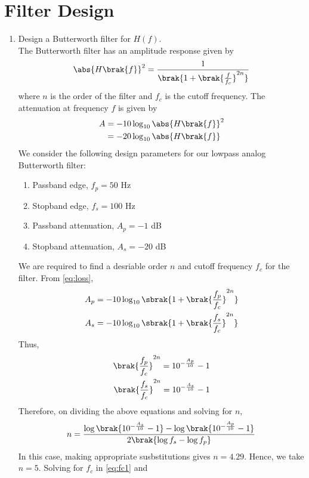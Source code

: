 \documentclass[journal,12pt,twocolumn]{IEEEtran}
\renewcommand\thesection{\arabic{section}}
\begin{document}
\section{Filter Design}
\begin{enumerate}[label=\thesection.\arabic*
,ref=\thesection.\theenumi]
\item Design a Butterworth filter for $H(f)$. \\
\solution
The Butterworth filter has an amplitude response
given by
\begin{align}
	\abs{H\brak{f}}^2 = \frac{1}{\brak{1 + \brak{\frac{f}{f_c}}^{2n}}}
\end{align}
where $n$ is the order of the filter and $f_c$ is the cutoff
frequency. The attenuation at frequency $f$ is given by 
\begin{align}
	A &= -10\log_{10}\abs{H\brak{f}}^2 \\
	&= -20\log_{10}\abs{H\brak{f}}
	\label{eq:loss}
\end{align}
We consider the following design parameters for our
lowpass analog Butterworth filter:
\begin{enumerate}
	\item Passband edge, $f_p = 50$ Hz
	\item Stopband edge, $f_s = 100$ Hz
	\item Passband attenuation, $A_p = -1$ dB
	\item Stopband attenuation, $A_s = -20$ dB
\end{enumerate}
We are required to find a desriable order $n$ and cutoff
frequency $f_c$ for the filter. From \eqref{eq:loss},
\begin{align}
	A_p &= -10\log_{10}\sbrak{1 + \brak{\frac{f_p}{f_c}}^{2n}} \\
	A_s &= -10\log_{10}\sbrak{1 + \brak{\frac{f_s}{f_c}}^{2n}}
\end{align}
Thus,
\begin{align}
	\brak{\frac{f_p}{f_c}}^{2n} = 10^{-\frac{A_p}{10}} - 1 \label{eq:fc1} \\
	\brak{\frac{f_s}{f_c}}^{2n} = 10^{-\frac{A_s}{10}} - 1 \label{eq:fc2}
\end{align}
Therefore, on dividing the above equations and solving for $n$,
\begin{align}
	n = \frac{\log\brak{10^{-\frac{A_s}{10}} - 1} - 
		\log\brak{10^{-\frac{A_p}{10}} - 1}}{2\brak{\log{f_s} - \log{f_p}}}
\end{align}
In this case, making appropriate susbstitutions gives $n = 4.29$.
Hence, we take $n = 5$. Solving for $f_c$ in \eqref{eq:fc1} and

\end{enumerate}
\end{document}
